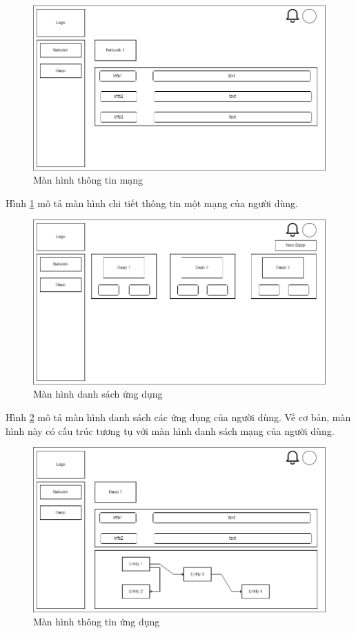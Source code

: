 \documentclass[../DoAn.tex]{subfiles}
\begin{document}
\begin{figure}[H]
    \centering
    \includegraphics[width=0.75\linewidth]{Hinhve/DoAn-ScreenNetworkDetail.drawio.png}
    \caption{Màn hình thông tin mạng}
    \label{fig:screenNetworkDetail}
\end{figure}

Hình \ref{fig:screenNetworkDetail} mô tả màn hình chi tiết thông tin một mạng
của người dùng.

\begin{figure}[H]
    \centering
    \includegraphics[width=0.75\linewidth]{Hinhve/DoAn-ScreenDapps.drawio.png}
    \caption{Màn hình danh sách ứng dụng}
    \label{fig:screenDapps}
\end{figure}

Hình \ref{fig:screenDapps} mô tả màn hình danh sách các ứng dụng của người
dùng. Về cơ bản, màn hình này có cấu trúc tương tụ với màn hình danh sách mạng
của người dùng.

\begin{figure}[H]
    \centering
    \includegraphics[width=0.75\linewidth]{Hinhve/DoAn-ScreenDappDetail.drawio.png}
    \caption{Màn hình thông tin ứng dụng}
    \label{fig:screenDappDetail}
\end{figure}
\end{document}
